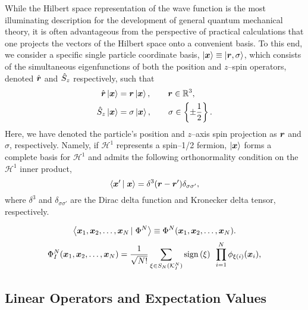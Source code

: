 While the Hilbert space representation of the wave function is the most illuminating description for the development of
general quantum mechanical theory, it is often advantageous from the perspective of practical calculations that one
projects the vectors of the Hilbert space onto a convenient basis. 
To this end, we consider a specific single particle coordinate basis, $\left\vert \boldsymbol{x} \right\rangle \equiv \left\vert \boldsymbol{r},\sigma \right\rangle$, 
which consists of the simultaneous eigenfunctions
of both the position and $z$--spin operators, denoted $\hat{\boldsymbol{r}}$ and $\hat{S}_z$ respectively,
such that
\begin{align}
  \hat{\boldsymbol{r}}\left\vert \boldsymbol{x} \right\rangle &= \boldsymbol{r}\left\vert \boldsymbol{x} \right\rangle, \qquad \boldsymbol{r}\in\mathbb{R}^3, \\
  \hat{S}_z\left\vert \boldsymbol{x} \right\rangle    &= \sigma\left\vert \boldsymbol{x} \right\rangle, \qquad \sigma \in \left \lbrace \pm\frac{1}{2} \right\rbrace.
\end{align}
Here, we have denoted the particle's position and $z$--axis spin projection as $\boldsymbol{r}$ and $\sigma$, respectively.
Namely, if $\mathcal{H}^1$ represents a spin--1/2 fermion, $\left\vert \boldsymbol{x} \right\rangle$ forms a complete basis for $\mathcal{H}^1$ 
and admits the following orthonormality  condition on the $\mathcal{H}^1$ inner product,
\begin{equation}
  \left\langle \boldsymbol{x}' \left\vert\right. \boldsymbol{x} \right\rangle = \delta^3(\boldsymbol{r} - \boldsymbol{r}')\delta_{\sigma\sigma'},
\end{equation}
where $\delta^3$ and $\delta_{\sigma\sigma'}$ are the Dirac delta function and Kronecker delta tensor, respectively.

\begin{equation}
  \left\langle \boldsymbol{x}_1,\boldsymbol{x}_2,\ldots,\boldsymbol{x}_N \left\vert\right. \Phi^N \right\rangle \equiv \Phi^N(\boldsymbol{x}_1,\boldsymbol{x}_2,\ldots,\boldsymbol{x}_N).
\end{equation}
\begin{equation}
  \label{eq:SlaterDetSpace}
  \Phi_I^N(\boldsymbol{x}_1,\boldsymbol{x}_2,\ldots,\boldsymbol{x}_N) = \frac{1}{\sqrt{N!}} \sum_{\xi \in S_N(\mathcal{K}^N_I)} \mathrm{sign}\left( \xi \right) \text{ } 
    \prod_{i = 1 }^N \phi_{\xi(i)}(\boldsymbol{x}_i),
\end{equation}

\subsection{Linear Operators and Expectation Values}
\label{sec:LO}

